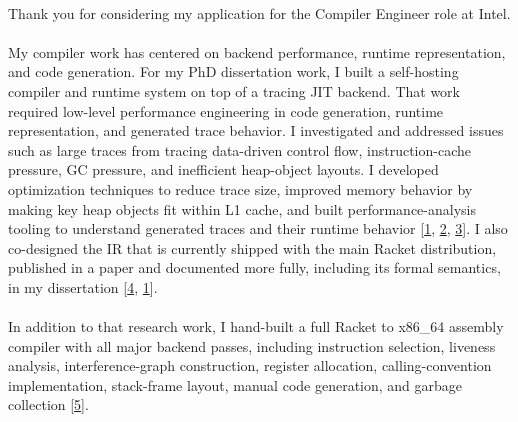 

\newcommand{\dissertationurl}{https://github.com/cderici/dissertation/releases/download/latest-pdf/thesis.pdf}
\newcommand{\pycketperfurl}{https://github.com/cderici/pycket-performance}
\newcommand{\tracedrawurl}{https://github.com/cderici/trace-draw}
\newcommand{\raxurl}{https://github.com/cderici/rax}
\newcommand{\icfpreporturl}{https://dl.acm.org/doi/10.1145/3341642}
\newcommand{\atwurl}{https://github.com/cderici/around-the-world-in-26-languages}
\newcommand{\homelaburl}{https://home.dericilab.live/homelab/}
\newcommand{\edinburghurl}{https://github.com/cderici/around-the-world-in-compilers/blob/main/langs/edinburgh/README.md}




\paragraph{} %
Thank you for considering my application for the Compiler Engineer role at Intel.

\paragraph{} %
My compiler work has centered on backend performance, runtime representation, and code generation. For my PhD dissertation work, I built a self-hosting compiler and runtime system on top of a tracing JIT backend. That work required low-level performance engineering in code generation, runtime representation, and generated trace behavior. I investigated and addressed issues such as large traces from tracing data-driven control flow, instruction-cache pressure, GC pressure, and inefficient heap-object layouts. I developed optimization techniques to reduce trace size, improved memory behavior by making key heap objects fit within L1 cache, and built performance-analysis tooling to understand generated traces and their runtime behavior [\href{\dissertationurl}{1}, \href{\pycketperfurl}{2}, \href{\tracedrawurl}{3}]. I also co-designed the IR that is currently shipped with the main Racket distribution, published in a paper and documented more fully, including its formal semantics, in my dissertation [\href{\icfpreporturl}{4}, \href{\dissertationurl}{1}].

\paragraph{} %
In addition to that research work, I hand-built a full Racket to x86\_64 assembly compiler with all major backend passes, including instruction selection, liveness analysis, interference-graph construction, register allocation, calling-convention implementation, stack-frame layout, manual code generation, and garbage collection [\href{\raxurl}{5}].

